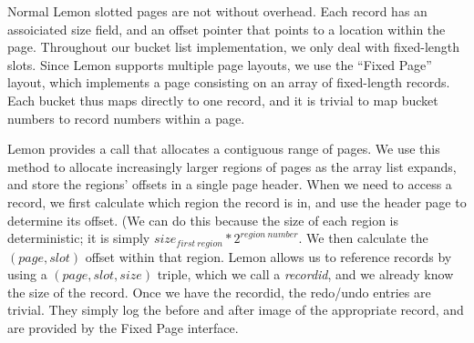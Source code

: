 \documentclass[letterpaper,twocolumn,english]{article}
\newcommand{\yad}{Lemon\xspace}
\newcommand{\eab}[1]{{\bf EAB: #1}}
\begin{document}

Normal \yad slotted pages are not without overhead.  Each record has
an assoiciated size field, and an offset pointer that points to a
location within the page.  Throughout our bucket list implementation,
we only deal with fixed-length slots.  Since \yad supports multiple
page layouts, we use the ``Fixed Page'' layout, which implements a
page consisting on an array of fixed-length records.  Each bucket thus
maps directly to one record, and it is trivial to map bucket numbers
to record numbers within a page.  

\yad provides a call that allocates a contiguous range of pages.  We
use this method to allocate increasingly larger regions of pages as
the array list expands, and store the regions' offsets in a single 
page header.  When we need to access a record, we first calculate 
which region the record is in, and use the header page to determine 
its offset.  (We can do this because the size of each region is 
deterministic; it is simply $size_{first~region} * 2^{region~number}$.  
We then calculate the $(page,slot)$ offset within that region.  \yad 
allows us to reference records by using a $(page,slot,size)$ triple, 
which we call a {\em recordid}, and we already know the size of the 
record.  Once we have the recordid, the redo/undo entries are trivial.  
They simply log the before and after image of the appropriate record, 
and are provided by the Fixed Page interface.

%

\end{document}
